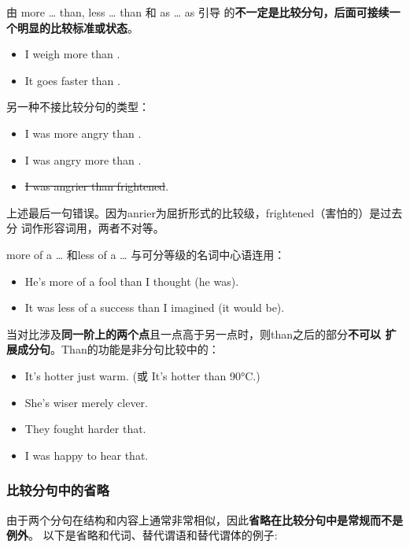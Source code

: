由 more \ldots{} than, less \ldots{} than 和 as \ldots{} as 引导
的\textbf{不一定是比较分句，后面可接续一个明显的比较标准或状态}。
\begin{itemize}
\item I weigh more than .

\item It goes faster than .

\end{itemize}

另一种不接比较分句的类型：
\begin{itemize}
\item I was more angry than .
\item I was angry more  than .

\item \sout{I was angrier than frightened}.
\end{itemize}
上述最后一句错误。因为anrier为屈折形式的比较级，frightened（害怕的）是过去分
词作形容词用，两者不对等。

more of a \ldots{} 和less of a \ldots{} 与可分等级的名词中心语连用：
\begin{itemize}
\item He's more of a fool than I thought (he was).

\item It was less of a success than I imagined (it would be).
\end{itemize}

当对比涉及\textbf{同一阶上的两个点}且一点高于另一点时，则than之后的部分\textbf{不可以
扩展成分句}。Than的功能是非分句比较中的：
\begin{itemize}
\item It's hotter  just warm. (或 It's hotter than 90°C.)
\item She's wiser  merely clever.
\item They fought harder  that.
\item I was  happy to hear that.
\end{itemize}

\subsubsection{比较分句中的省略}

由于两个分句在结构和内容上通常非常相似，因此\textbf{省略在比较分句中是常规而不是例外}。
以下是省略和代词、替代谓语和替代谓体的例子:

